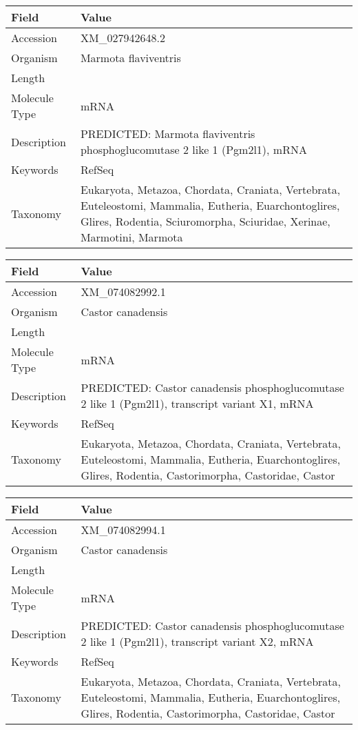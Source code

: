 \documentclass[10pt]{article}
\begin{document}
\vspace{1em}
{\footnotesize
\begin{longtable}{>{\raggedright\arraybackslash}p{4.5cm} >{\raggedright\arraybackslash}p{11.5cm}}
\textbf{Field} & \textbf{Value} \\
\hline
Accession & XM\_027942648.2 \\
Organism & Marmota flaviventris \\
Length & 7740 \\
Molecule Type & mRNA \\
Description & PREDICTED: Marmota flaviventris phosphoglucomutase 2 like 1 (Pgm2l1), mRNA \\
Keywords & RefSeq \\
Taxonomy & Eukaryota, Metazoa, Chordata, Craniata, Vertebrata, Euteleostomi, Mammalia, Eutheria, Euarchontoglires, Glires, Rodentia, Sciuromorpha, Sciuridae, Xerinae, Marmotini, Marmota \\
\end{longtable}
}

\vspace{1em}
{\footnotesize
\begin{longtable}{>{\raggedright\arraybackslash}p{4.5cm} >{\raggedright\arraybackslash}p{11.5cm}}
\textbf{Field} & \textbf{Value} \\
\hline
Accession & XM\_074082992.1 \\
Organism & Castor canadensis \\
Length & 8074 \\
Molecule Type & mRNA \\
Description & PREDICTED: Castor canadensis phosphoglucomutase 2 like 1 (Pgm2l1), transcript variant X1, mRNA \\
Keywords & RefSeq \\
Taxonomy & Eukaryota, Metazoa, Chordata, Craniata, Vertebrata, Euteleostomi, Mammalia, Eutheria, Euarchontoglires, Glires, Rodentia, Castorimorpha, Castoridae, Castor \\
\end{longtable}
}

\vspace{1em}
{\footnotesize
\begin{longtable}{>{\raggedright\arraybackslash}p{4.5cm} >{\raggedright\arraybackslash}p{11.5cm}}
\textbf{Field} & \textbf{Value} \\
\hline
Accession & XM\_074082994.1 \\
Organism & Castor canadensis \\
Length & 8232 \\
Molecule Type & mRNA \\
Description & PREDICTED: Castor canadensis phosphoglucomutase 2 like 1 (Pgm2l1), transcript variant X2, mRNA \\
Keywords & RefSeq \\
Taxonomy & Eukaryota, Metazoa, Chordata, Craniata, Vertebrata, Euteleostomi, Mammalia, Eutheria, Euarchontoglires, Glires, Rodentia, Castorimorpha, Castoridae, Castor \\
\end{longtable}
}
\end{document}
